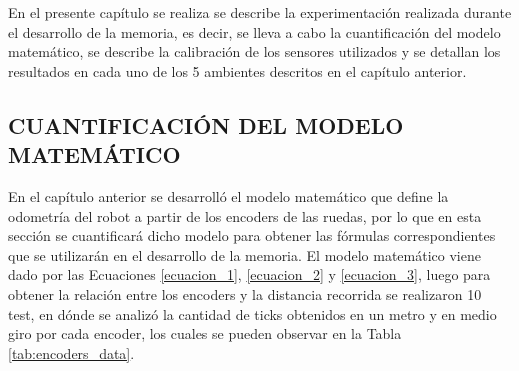 
En el presente capítulo se realiza se describe la experimentación realizada durante el desarrollo de la memoria, es decir, se lleva a cabo la cuantificación del modelo matemático, se describe la calibración de los sensores utilizados y se detallan los resultados en cada uno de los 5 ambientes descritos en el capítulo anterior.

\subsection{CUANTIFICACIÓN DEL MODELO MATEMÁTICO}

En el capítulo anterior se desarrolló el modelo matemático que define la odometría del robot a partir de los encoders de las ruedas, por lo que en esta sección se cuantificará dicho modelo para obtener las fórmulas correspondientes que se utilizarán en el desarrollo de la memoria.
El modelo matemático viene dado por las Ecuaciones \ref{ecuacion_1}, \ref{ecuacion_2} y \ref{ecuacion_3}, luego para obtener la relación entre los encoders y la distancia recorrida se realizaron 10 test, en dónde se analizó la cantidad de ticks obtenidos en un metro y en medio giro por cada encoder, los cuales se pueden observar en la Tabla \ref{tab:encoders_data}.

